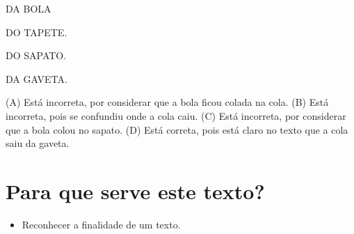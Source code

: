 \begin{minipage}{.5\textwidth}
\begin{escolha}
\item DA BOLA

\item DO TAPETE.

\item DO SAPATO.

\item DA GAVETA.
\end{escolha}
\end{minipage}

(A) Está incorreta, por considerar que a bola ficou colada na cola.
(B) Está incorreta, pois se confundiu onde a cola caiu.
(C) Está incorreta, por considerar que a bola colou no sapato.
(D) Está correta, pois está claro no texto que a cola saiu da gaveta.

\chapter{Para que serve este texto?}



\begin{itemize}
\item Reconhecer a finalidade de um texto.
\end{itemize}

